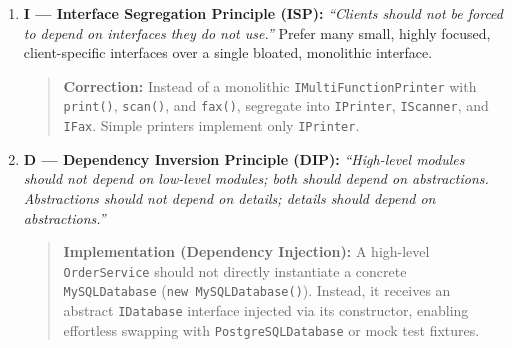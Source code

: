 \begin{enumerate}
\begin{quote}
    \end{quote}
    \item \textbf{I --- Interface Segregation Principle (ISP):}
    \textit{``Clients should not be forced to depend on interfaces they do not use.''} Prefer many small, highly focused, client-specific interfaces over a single bloated, monolithic interface.
    \begin{quote}
    \textbf{Correction:} Instead of a monolithic \texttt{IMultiFunctionPrinter} with \texttt{print()}, \texttt{scan()}, and \texttt{fax()}, segregate into \texttt{IPrinter}, \texttt{IScanner}, and \texttt{IFax}. Simple printers implement only \texttt{IPrinter}.
    \end{quote}
    \item \textbf{D --- Dependency Inversion Principle (DIP):}
    \textit{``High-level modules should not depend on low-level modules; both should depend on abstractions. Abstractions should not depend on details; details should depend on abstractions.''}
    \begin{quote}
    \textbf{Implementation (Dependency Injection):} A high-level \texttt{OrderService} should not directly instantiate a concrete \texttt{MySQLDatabase} (\texttt{new MySQLDatabase()}). Instead, it receives an abstract \texttt{IDatabase} interface injected via its constructor, enabling effortless swapping with \texttt{PostgreSQLDatabase} or mock test fixtures.
    \end{quote}
\end{enumerate}

